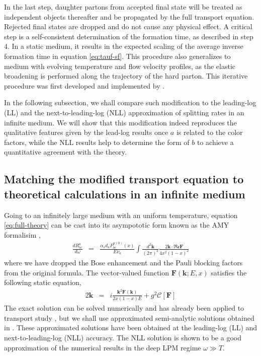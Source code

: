 \documentclass[aps, prc, reprint, amsmath, groupedaddress, nofootinbib]{revtex4-1}
\begin{document}
In the last step, daughter partons from accepted final state will be treated as independent objects thereafter and be propagated by the full transport equation.
Rejected final states are dropped and do not cause any physical effect. 
A critical step is a self-consistent determination of the formation time, as described in step 4. 
In a static medium, it results in the expected scaling of the average inverse formation time in equation \ref{eq:tauf-sf}.
This procedure also generalizes to medium with evolving temperature and flow velocity profiles, as the elastic broadening is performed along the trajectory of the hard parton.
This iterative procedure was first developed and implemented by \cite{Zapp:2011ya}.

In the following subsection, we shall compare such modification to the leading-log (LL) and the next-to-leading-log (NLL) approximation of splitting rates in an infinite medium. 
We will show that this modification indeed reproduces the qualitative features given by the lead-log results once $a$ is related to the color factors, while the NLL results help to determine the form of $b$ to achieve a quantitative agreement with the theory.

\subsection{Matching the modified transport equation to theoretical calculations in an infinite medium}
Going to an infinitely large medium with an uniform temperature, equation \ref{eq:full-theory} can be cast into its asympototic form known as the AMY formalisim \cite{Arnold:2002ja,Arnold:2002zm,Arnold:2003zc},
\begin{eqnarray}\label{eq:AMY-1}
\frac{dR^a_{bc}}{d\omega} &=& \frac{\alpha_s d_a P^{a(0)}_{bc}(x)}{E\nu_a} \int\frac{d^2\mathbf{k}}{(2\pi)^2} \frac{2\mathbf{k}\cdot \mathfrak{Re} \mathbf{F}}{4x^2(1-x)^2}
\end{eqnarray}
where we have dropped the Bose enhancement and the Pauli blocking factors from the original formula.
The vector-valued function $\mathbf{F}(\mathbf{k}; E, x)$ satisfies the following static equation,
\begin{eqnarray}\label{eq:AMY-2}
2\mathbf{k} &=& i\frac{\mathbf{k}^2 \mathbf{F}(\mathbf{k})}{2x(1-x)E} + g^2 \mathcal{C}[\mathbf{F}]
\end{eqnarray} 
The exact solution can be solved numerically and has already been applied to transport study \cite{Jeon:2003gi,Schenke:2009gb}, but we shall use approximated semi-analytic solutions obtained in \cite{Arnold:2008zu}.
These approximated solutions have been obtained at the leading-log (LL) and next-to-leading-log (NLL) accuracy. 
The NLL solution is shown to be a good approximation of the numerical results in the deep LPM regime $\omega \gg T$.
\end{document}

